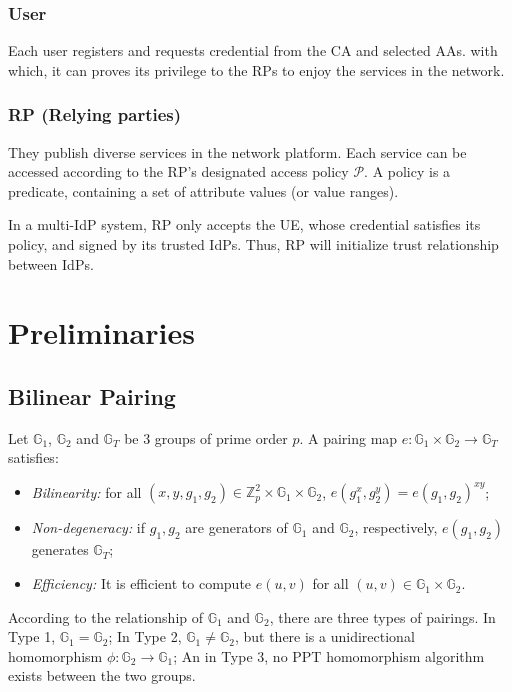 \documentclass[journal]{IEEEtran}
\begin{document}
\subsubsection{User}
Each user registers and requests credential from the CA and selected AAs. with which, it can proves its privilege to the RPs to enjoy the services in the network. 

\subsubsection{RP (Relying parties)}
They publish diverse services in the network platform. Each service can be accessed according to the RP's designated access policy $\mathcal{P}$. A policy is a predicate, containing a set of attribute values (or value ranges).

In a multi-IdP system, RP only accepts the UE, whose credential satisfies its policy, and signed by its trusted IdPs. Thus, RP will initialize trust relationship between IdPs.



\section{Preliminaries}\label{sec:pre}
\subsection{Bilinear Pairing}
Let $\mathbb{G}_1$, $\mathbb{G}_2$ and $\mathbb{G}_T$ be 3 groups of prime order $p$. A pairing map $e:\mathbb{G}_1\times \mathbb{G}_2\rightarrow\mathbb{G}_T$ satisfies:
\begin{itemize}
	\item \textit{Bilinearity:} for all $(x,y, g_1, g_2) \in \mathbb{Z}_p^2\times \mathbb{G}_1\times \mathbb{G}_2$, $e(g_1^x, g_2^y) = e(g_1, g_2)^{xy}$;
	\item \textit{Non-degeneracy:} if $g_1, g_2$ are generators of $\mathbb{G}_1$ and $\mathbb{G}_2$, respectively, $e(g_1, g_2)$ generates $\mathbb{G}_T$;
	\item \textit{Efficiency:} It is efficient to compute $e(u,v)$ for all $(u, v) \in \mathbb{G}_1\times \mathbb{G}_2$.
\end{itemize}

According to the relationship of $\mathbb{G}_1$ and $\mathbb{G}_2$, there are three types of pairings. 
In Type 1, $\mathbb{G}_1 = \mathbb{G}_2$; In Type 2, $\mathbb{G}_1 \neq \mathbb{G}_2$, but there is a unidirectional homomorphism $\phi:\mathbb{G}_2 \rightarrow \mathbb{G}_1$; An in Type 3, no PPT homomorphism algorithm exists between the two groups.
\end{document}
